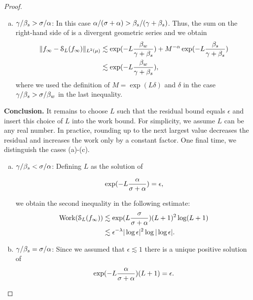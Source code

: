 \begin{proof}
\begin{enumerate}[(a)]
				\item $\gamma/\beta_{s}>\sigma/\alpha$: In this case $\alpha/(\sigma+\alpha)>\beta_{s}/(\gamma+\beta_{s})$. Thus, the sum on the right-hand side of  is a divergent geometric series and we obtain 
				\begin{equation*}
				\begin{split}
				\|f_{\infty}-\mathcal{S}_{L}(f_{\infty})\|_{L^2(\mu)}&\lesssim \exp(-L\frac{\beta_{w}}{\gamma+\beta_{s}})+M^{-\alpha}\exp(-L\frac{\beta_{s}}{\gamma+\beta_{s}})\\
				&\lesssim \exp(-L\frac{\beta_{w}}{\gamma+\beta_{s}}),
				\end{split}
				\end{equation*}
				where we used the definition of $M=\exp(L\delta)$ and $\delta$ in the case $\gamma/\beta_{s}>\sigma/\beta_{w}$ in the last inequality.
			\end{enumerate}
			
			\textbf{Conclusion.} It remains to choose $L$ such that the residual bound equals $\epsilon$ and insert this choice of $L$ into the work bound. For simplicity, we assume $L$ can be any real number. In practice, rounding up to the next largest value decreases the residual and increases the work only by a constant factor. One final time, we distinguish the cases (a)-(c).
			
		\begin{enumerate}[(a)]
			\item $\gamma/\beta_{s}<\sigma/\alpha$: Defining $L$ as the solution of
			
			\begin{equation*}
			\exp(-L\frac{\alpha}{\sigma+\alpha})=\epsilon,
			\end{equation*}
			
			we obtain the second inequality in the following estimate:
			\begin{equation*}
			\begin{split}
		\text{Work}(\mathcal{S}_{L}(f_{\infty}))&\lesssim \exp(L\frac{\sigma}{\sigma+\alpha})(L+1)^2\log (L+1)\\
		&\lesssim	\epsilon^{-\lambda}|\log\epsilon|^2\log|\log \epsilon|.
			\end{split}
			\end{equation*}
			
			\item $\gamma/\beta_{s}=\sigma/\alpha$: 			Since we assumed that $\epsilon\lesssim 1$ there is a unique positive solution of
			\begin{equation*}
			\exp(-L\frac{\alpha}{\sigma+\alpha})(L+1)=\epsilon.
			\end{equation*}
			

\end{enumerate}
\end{proof}
